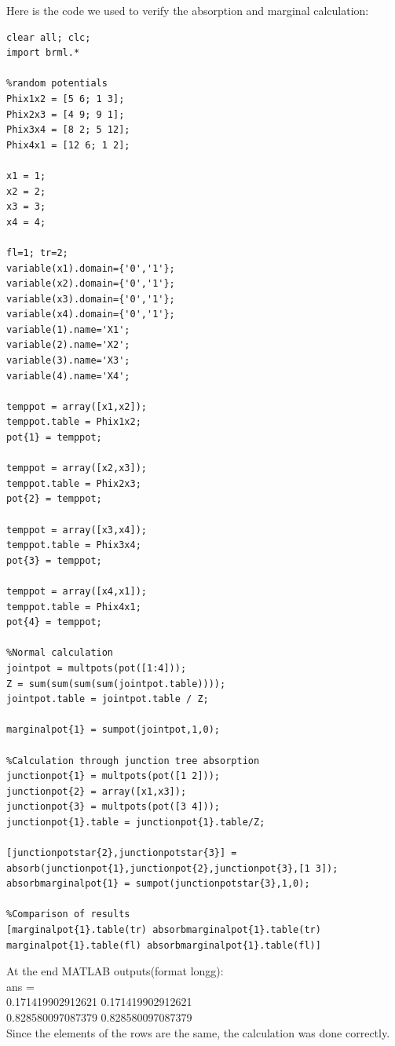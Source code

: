 \documentclass[11pt,a4paper,oneside]{report}
\begin{document}
Here is the code we used to verify the absorption and marginal calculation:
\begin{lstlisting}
clear all; clc;
import brml.*

%random potentials
Phix1x2 = [5 6; 1 3];
Phix2x3 = [4 9; 9 1];
Phix3x4 = [8 2; 5 12];
Phix4x1 = [12 6; 1 2];

x1 = 1;
x2 = 2;
x3 = 3;
x4 = 4;

fl=1; tr=2;
variable(x1).domain={'0','1'};
variable(x2).domain={'0','1'};
variable(x3).domain={'0','1'};
variable(x4).domain={'0','1'};
variable(1).name='X1';
variable(2).name='X2';
variable(3).name='X3';
variable(4).name='X4';

temppot = array([x1,x2]);
temppot.table = Phix1x2;
pot{1} = temppot;

temppot = array([x2,x3]);
temppot.table = Phix2x3;
pot{2} = temppot;

temppot = array([x3,x4]);
temppot.table = Phix3x4;
pot{3} = temppot;

temppot = array([x4,x1]);
temppot.table = Phix4x1;
pot{4} = temppot;

%Normal calculation
jointpot = multpots(pot([1:4])); 
Z = sum(sum(sum(sum(jointpot.table))));
jointpot.table = jointpot.table / Z;

marginalpot{1} = sumpot(jointpot,1,0);

%Calculation through junction tree absorption
junctionpot{1} = multpots(pot([1 2]));
junctionpot{2} = array([x1,x3]);
junctionpot{3} = multpots(pot([3 4]));
junctionpot{1}.table = junctionpot{1}.table/Z;

[junctionpotstar{2},junctionpotstar{3}] = absorb(junctionpot{1},junctionpot{2},junctionpot{3},[1 3]);
absorbmarginalpot{1} = sumpot(junctionpotstar{3},1,0);

%Comparison of results
[marginalpot{1}.table(tr) absorbmarginalpot{1}.table(tr)
marginalpot{1}.table(fl) absorbmarginalpot{1}.table(fl)]
\end{lstlisting}

At the end MATLAB outputs(format longg):\\

ans =\\
         0.171419902912621         0.171419902912621\\
         0.828580097087379         0.828580097087379\\
         
Since the elements of the rows are the same, the calculation was done correctly.
\end{document}
